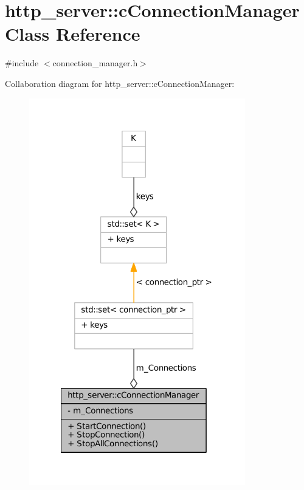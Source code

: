 \hypertarget{classhttp__server_1_1cConnectionManager}{\section{http\-\_\-server\-:\-:c\-Connection\-Manager \-Class \-Reference}
\label{classhttp__server_1_1cConnectionManager}
}


{\ttfamily \#include $<$connection\-\_\-manager.\-h$>$}



\-Collaboration diagram for http\-\_\-server\-:\-:c\-Connection\-Manager\-:
\nopagebreak
\begin{figure}[H]
\begin{center}
\leavevmode
\includegraphics[width=266pt]{classhttp__server_1_1cConnectionManager__coll__graph}
\end{center}
\end{figure}
